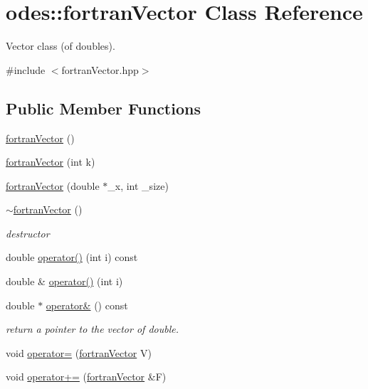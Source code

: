\hypertarget{classodes_1_1fortranVector}{\section{odes\-:\-:fortran\-Vector Class Reference}
\label{classodes_1_1fortranVector}
}


Vector class (of doubles).  




{\ttfamily \#include $<$fortran\-Vector.\-hpp$>$}

\subsection*{Public Member Functions}
\begin{DoxyCompactItemize}
\item 
\hyperlink{classodes_1_1fortranVector_a1fb7a9d331cb23faf606e9ef75c18ef1}{fortran\-Vector} ()
\item 
\hyperlink{classodes_1_1fortranVector_aaa6fa4f6992cd736fff53abc7415dd87}{fortran\-Vector} (int k)
\item 
\hyperlink{classodes_1_1fortranVector_a258c9cacdb8adf64b21a9fdcf2edf7fb}{fortran\-Vector} (double $\ast$\-\_\-x, int \-\_\-size)
\item 
\hyperlink{classodes_1_1fortranVector_a57ebd8f0cc1aa20cbe956ff5be3180c3}{$\sim$fortran\-Vector} ()
\begin{DoxyCompactList}\small\item\em destructor \end{DoxyCompactList}\item 
double \hyperlink{classodes_1_1fortranVector_acd2f3c622c5c901e0a2fcefc445fb74c}{operator()} (int i) const 
\item 
double \& \hyperlink{classodes_1_1fortranVector_a9177196a3ec94139a163e7fa8b19b92b}{operator()} (int i)
\item 
double $\ast$ \hyperlink{classodes_1_1fortranVector_ada6f1dfa695ada960f621d9728e0f8e0}{operator\&} () const 
\begin{DoxyCompactList}\small\item\em return a pointer to the vector of double. \end{DoxyCompactList}\item 
void \hyperlink{classodes_1_1fortranVector_a2efd6f462acf48bc8f064659f5a0dc40}{operator=} (\hyperlink{classodes_1_1fortranVector}{fortran\-Vector} V)
\item 
void \hyperlink{classodes_1_1fortranVector_ae522acf0f26411ce0ee14c77cddd7bfa}{operator+=} (\hyperlink{classodes_1_1fortranVector}{fortran\-Vector} \&F)

\end{DoxyCompactItemize}
